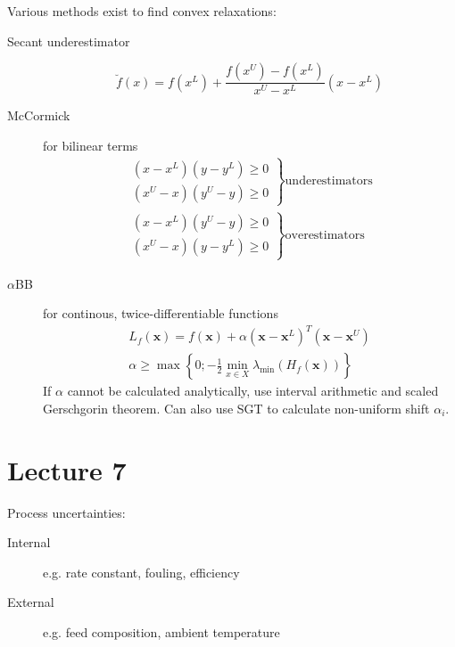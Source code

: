 \documentclass[a4paper,twocolumn,10pt]{article}
\begin{document}
Various methods exist to find convex relaxations:
\begin{description}
    \item[Secant underestimator]
        \begin{equation}
            \breve{f}(x)=f\left(x^{L}\right)+\frac{f\left(x^{U}\right)-f\left(x^{L}\right)}{x^{U}-x^{L}}\left(x-x^{L}\right)
        \end{equation}
    \item[McCormick] for bilinear terms
        \begin{gather*}
            \left.\begin{array}{l}
                (x-x^L)(y-y^L) \geq 0 \\
                (x^U-x)(y^U-y) \geq 0        
            \end{array} \right\} \text{underestimators} \\
            \left.\begin{array}{l}
                (x-x^L)(y^U-y) \geq 0 \\
                (x^U-x)(y-y^L) \geq 0
            \end{array} \right\} \text{overestimators}
        \end{gather*}
    \item[$\alpha$BB] for continous, twice-differentiable functions
        \begin{gather}
            L_{f}(\boldsymbol{x})=f(\boldsymbol{x})+\alpha\left(\boldsymbol{x}-\boldsymbol{x}^{L}\right)^{T}\left(\boldsymbol{x}-\boldsymbol{x}^{U}\right) \\
            \alpha \geq \max \left\{0 ;-\frac{1}{2} \min _{x \in X} \lambda_{\min }\left(H_{f}(\boldsymbol{x})\right)\right\}
        \end{gather}
        If $\alpha$ cannot be calculated analytically, use interval arithmetic and scaled Gerschgorin theorem. Can also use SGT to calculate non-uniform shift $\alpha_i$.
\end{description}

\section{Lecture 7}
Process uncertainties:
\begin{description}
    \item[Internal] e.g. rate constant, fouling, efficiency
    \item[External] e.g. feed composition, ambient temperature
\end{description}
\end{document}
